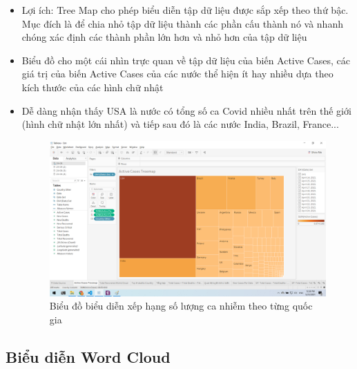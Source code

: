 \documentclass[a4paper, 12pt]{article}
\begin{document}
\begin{itemize}
    \item Lợi ích: Tree Map cho phép biểu diễn tập dữ liệu được sắp xếp theo thứ bậc. Mục đích là để chia nhỏ tập dữ liệu thành các phần cấu thành nó và nhanh chóng xác định các thành phần lớn hơn và nhỏ hơn của tập dữ liệu
    \item Biểu đồ cho một cái nhìn trực quan về tập dữ liệu của biến Active Cases, các giá trị của biến Active Cases của các nước thể hiện ít hay nhiều dựa theo kích thước của các hình chữ nhật
    \item Dễ dàng nhận thấy USA là nước có tổng số ca Covid nhiều nhất trên thế giới (hình chữ nhật lớn nhất) và tiếp sau đó là các nước India, Brazil, France...
    \begin{figure}[H]
        \begin{center}
            \includegraphics[scale=0.4]{img/treeMap.png}
            \caption{Biểu đồ biểu diễn xếp hạng số lượng ca nhiễm theo từng quốc gia}
        \end{center}
    \end{figure}
\end{itemize}

\subsection{Biểu diễn Word Cloud}
\end{document}
